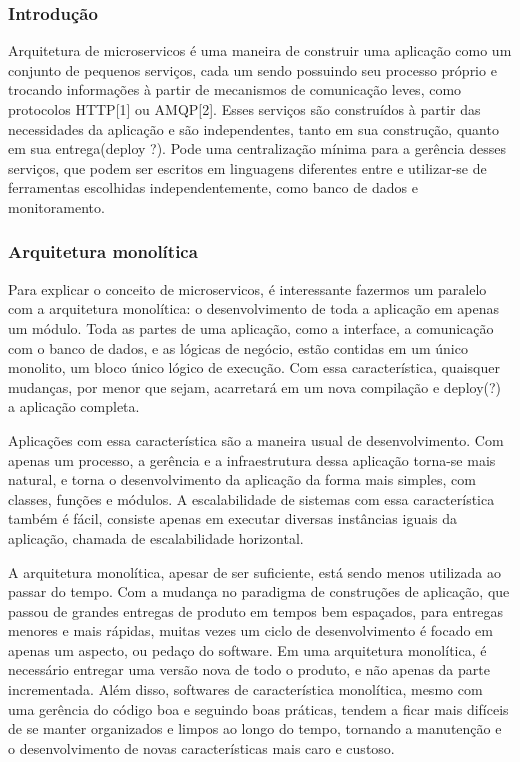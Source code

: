 
\subsubsection{Introdução}\label{sec:LABEL_CHP_4_SEC_B_SEC_A_SEC_A}

Arquitetura de microservicos é uma maneira de construir uma aplicação como um conjunto de pequenos serviços, cada um sendo possuindo seu processo próprio e trocando informações à partir de mecanismos de comunicação leves, como protocolos HTTP[1] ou AMQP[2]. Esses serviços são construídos à partir das necessidades da aplicação e são independentes, tanto em sua construção, quanto em sua entrega(deploy ?). Pode uma centralização mínima para a gerência desses serviços, que podem ser escritos em linguagens diferentes entre e utilizar-se de ferramentas escolhidas independentemente, como banco de dados e monitoramento.


\subsubsection{Arquitetura monolítica}\label{sec:LABEL_CHP_4_SEC_B_SEC_A_SEC_B}

Para explicar o conceito de microservicos, é interessante fazermos um paralelo com a arquitetura monolítica: o desenvolvimento de toda a aplicação em apenas um módulo.
Toda as partes de uma aplicação, como a interface, a comunicação com o banco de dados, e as lógicas de negócio, estão contidas em um único monolito, um bloco único lógico de execução. Com essa característica, quaisquer mudanças, por menor que sejam, acarretará em um nova compilação e deploy(?) a aplicação completa. 

Aplicações com essa característica são a maneira usual de desenvolvimento. Com apenas um processo, a gerência e a infraestrutura dessa aplicação torna-se mais natural, e torna o desenvolvimento da aplicação da forma mais simples, com classes, funções e módulos. A escalabilidade de sistemas com essa característica também é fácil, consiste  apenas em executar diversas instâncias iguais da aplicação, chamada de escalabilidade horizontal.

A arquitetura monolítica, apesar de ser suficiente, está sendo menos utilizada ao passar do tempo. Com a mudança no paradigma de construções de aplicação, que passou de grandes entregas de produto em tempos bem espaçados, para entregas menores e mais rápidas, muitas vezes um ciclo de desenvolvimento é focado em apenas um aspecto, ou pedaço do software. Em uma arquitetura monolítica, é necessário entregar uma versão nova de todo o produto, e não apenas da parte incrementada. 
Além disso, softwares de característica monolítica, mesmo com uma gerência do código boa e seguindo boas práticas, tendem a ficar mais difíceis de se manter organizados e limpos ao longo do tempo, tornando a manutenção e o desenvolvimento de novas características mais caro e custoso.


